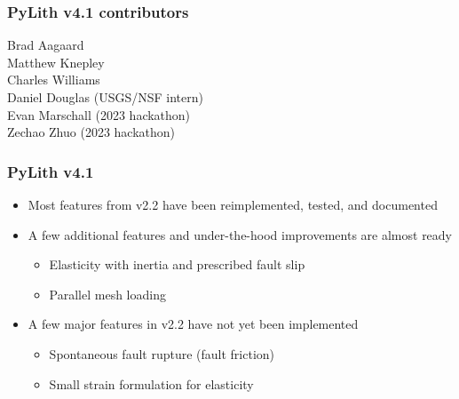 \documentclass[aspectratio=169]{beamer}
\begin{document}
\begin{frame}
  \frametitle{PyLith v4.1 contributors}

  Brad Aagaard \\
  Matthew Knepley \\
  Charles Williams \\
  Daniel Douglas (USGS/NSF intern) \\
  Evan Marschall (2023 hackathon) \\
  Zechao Zhuo (2023 hackathon)
  
\end{frame}


\begin{frame}
  \frametitle{PyLith v4.1}
  \summary{}

  \begin{itemize}
  \item Most features from v2.2 have been reimplemented, tested, and documented
  \item A few additional features and under-the-hood improvements are almost ready
    \begin{itemize}
    \item Elasticity with inertia and prescribed fault slip
    \item Parallel mesh loading
    \end{itemize}
  \item A few major features in v2.2 have not yet been implemented
    \begin{itemize}
    \item Spontaneous fault rupture (fault friction)
    \item Small strain formulation for elasticity
    \end{itemize}    
  \end{itemize}

\end{frame}
\end{document}
